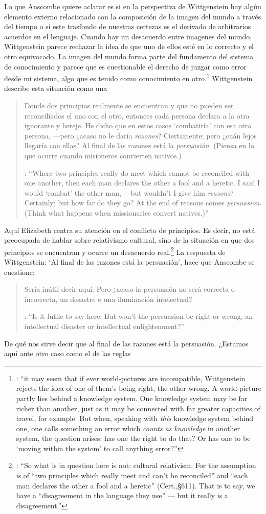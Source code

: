 Lo que Anscombe quiere aclarar es si en la perspectiva de Wittgenstein hay algún elemento externo relacionado con la composición de la imagen del mundo a través del tiempo o si este trasfondo de nuestras certezas es el derivado de arbitrarios acuerdos en el lenguaje. Cuando hay un desacuerdo entre imagenes del mundo, Wittgenstein parece rechazar la idea de que uno de ellos esté en lo correcto y el otro equivocado. La imagen del mundo forma parte del fundamento del sistema de conocimiento y parece que es cuestionable el derecho de juzgar como error desde mi sistema, algo que es tenido como conocimiento en otro.\footnote{\cite[Cf.~][131--132]{anscombe1981parmenides:qli}: \enquote{it may seem that if ever world-pictures are incompatible, Wittgenstein rejects the idea of one of them's being right, the other wrong. A world-picture partly lies behind a knowledge system. One knowledge system may be far richer than another, just as it may be connected with far greater capacities of travel, for example. But when, speaking with \emph{this} knowledge system behind one, one calls something an error which \emph{counts as knowledge} in another system, the question arises: has one the right to do that? Or has one to be `moving within the system' to call anything error?}} Wittgenstein describe esta situación como una \blockquote[{\cite[\S611--612]{wittgenstein1969oncert}}: \enquote{Where two principles really do meet which cannot be reconciled with one another, then each man declares the other a fool and a heretic. I said I would `combat' the other man, ---but wouldn't I give him \emph{reasons}? Certainly; but how far do they go? At the end of reasons comes \emph{persuasion}. (Think what happens when missionaries convert natives.)}]{Donde dos principios realmente se encuentran y que no pueden ser reconciliados el uno con el otro, entonces cada persona declara a la otra ignorante y hereje. He dicho que en estos casos `combatiría' con esa otra persona, ---pero ¿acaso no le daría \emph{razones}? Ciertamente; pero ¿cuán lejos llegaría con ellas? Al final de las razones está la \emph{persuasión}. (Piensa en lo que ocurre cuando misioneros convierten nativos.)} Aquí Elizabeth centra su atención en el conflicto de principios. Es decir, no está preocupada de hablar sobre relativismo cultural, sino de la situación en que dos principios se encuentran y ocurre un desacuerdo real.\footnote{\cite[Cf.~][131]{anscombe1981parmenides:qli}: \enquote{So what is in question here is not: cultural relativism. For the assumption is of ``two principles which really meet and can't be reconciled'' and ``each man declares the other a fool and a heretic'' (Cert.,\S611). That is to say, we have a ``disagreement in the language they use'' --- but it really is a disagreement.}} La respuesta de Wittgenstein: \enquote*{Al final de las razones está la persuasión}, hace que Anscombe se cuestione: \blockquote[{\cite{anscombe1981parmenides:qli}}: \enquote{Is it futile to say here: But won't the persuasion be right or wrong, an intellectual disaster or intellectual enlightenment?}]{Sería inútil decir aquí: Pero ¿acaso la persuasión no será correcta o incorrecta, un desastre o una iluminación intelectual?} De qué nos sirve decir que al final de las razones está la persuasión. ¿Estamos aquí ante otro caso como el de las reglas 